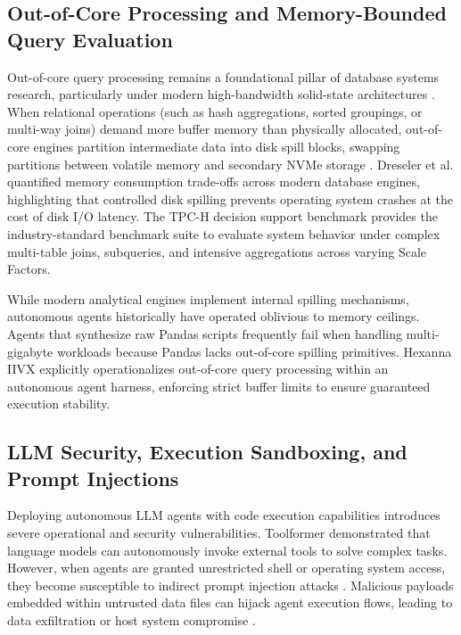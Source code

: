 \subsection{Out-of-Core Processing and Memory-Bounded Query Evaluation}
Out-of-core query processing remains a foundational pillar of database systems research, particularly under modern high-bandwidth solid-state architectures \cite{bandle2022nvme}. When relational operations (such as hash aggregations, sorted groupings, or multi-way joins) demand more buffer memory than physically allocated, out-of-core engines partition intermediate data into disk spill blocks, swapping partitions between volatile memory and secondary NVMe storage \cite{kohn2022adaptive}. Dreseler et al. \cite{dreseler2023benchmarking} quantified memory consumption trade-offs across modern database engines, highlighting that controlled disk spilling prevents operating system crashes at the cost of disk I/O latency. The TPC-H decision support benchmark \cite{tpch2021} provides the industry-standard benchmark suite to evaluate system behavior under complex multi-table joins, subqueries, and intensive aggregations across varying Scale Factors.

While modern analytical engines implement internal spilling mechanisms, autonomous agents historically have operated oblivious to memory ceilings. Agents that synthesize raw Pandas scripts frequently fail when handling multi-gigabyte workloads because Pandas lacks out-of-core spilling primitives. Hexanna IIVX explicitly operationalizes out-of-core query processing within an autonomous agent harness, enforcing strict buffer limits to ensure guaranteed execution stability.

\subsection{LLM Security, Execution Sandboxing, and Prompt Injections}
Deploying autonomous LLM agents with code execution capabilities introduces severe operational and security vulnerabilities. Toolformer \cite{schick2023toolformer} demonstrated that language models can autonomously invoke external tools to solve complex tasks. However, when agents are granted unrestricted shell or operating system access, they become susceptible to indirect prompt injection attacks \cite{greshake2023not}. Malicious payloads embedded within untrusted data files can hijack agent execution flows, leading to data exfiltration or host system compromise \cite{liu2023jailbreaking}.

